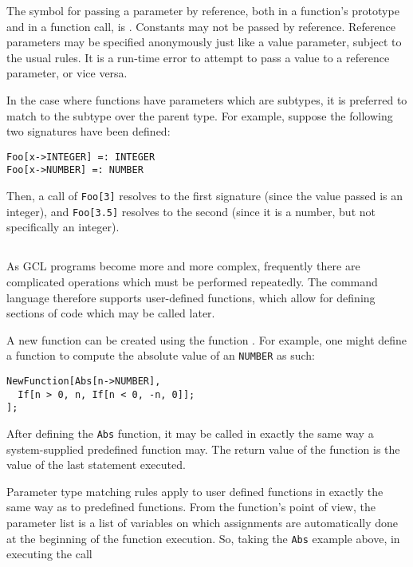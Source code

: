 The symbol for passing a parameter by reference, both in a function's
prototype and in a function call, is {\tt <->}.  Constants may not be
passed by reference.  Reference parameters may be specified
anonymously just like a value parameter, subject to the usual rules.
It is a run-time error to attempt to pass a value to a reference
parameter, or vice versa.

In the case where functions have parameters which are subtypes, 
it is preferred to match to the subtype over the parent type.  For example,
suppose the following two signatures have been defined:

\begin{verbatim}
Foo[x->INTEGER] =: INTEGER
Foo[x->NUMBER] =: NUMBER
\end{verbatim}

Then, a call of \verb+Foo[3]+ resolves to the first signature (since the
value passed is an integer), and \verb+Foo[3.5]+ resolves to the second
(since it is a number, but not specifically an integer).

\subsection{}

As GCL programs become more and more complex, frequently there are
complicated operations which must be performed repeatedly.  The
command language therefore supports user-defined functions, which
allow for defining sections of code which may be called later.

A new function can be created using the function .
For example, one might define a function to compute the absolute value
of an {\tt NUMBER} as such:

\begin{verbatim}
NewFunction[Abs[n->NUMBER],
  If[n > 0, n, If[n < 0, -n, 0]];
];
\end{verbatim}

\noindent After defining the \verb+Abs+ function, it may be called in
exactly the same way a system-supplied predefined function may.  The
return value of the function is the value of the last statement
executed.

Parameter type matching rules apply to user defined functions in
exactly the same way as to predefined functions.  From the function's
point of view, the parameter list is a list of variables on which
assignments are automatically done at the beginning of the function
execution.  So, taking the \verb+Abs+ example above, in executing the
call

